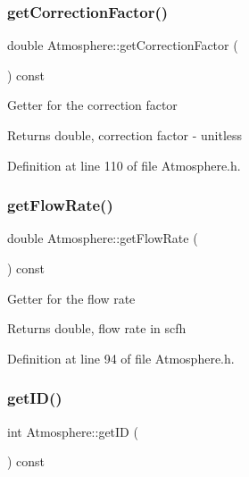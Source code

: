 \subsubsection{\texorpdfstring{get\+Correction\+Factor()}{getCorrectionFactor()}}
{\footnotesize\ttfamily double Atmosphere\+::get\+Correction\+Factor (\begin{DoxyParamCaption}{ }\end{DoxyParamCaption}) const\hspace{0.3cm}{\ttfamily [inline]}}

Getter for the correction factor \begin{DoxyReturn}{Returns}
double, correction factor -\/ unitless 
\end{DoxyReturn}


Definition at line 110 of file Atmosphere.\+h.

\mbox{\label{class_atmosphere_ad34708b12c8c9af4fce47669d68ebf4d}} 
\subsubsection{\texorpdfstring{get\+Flow\+Rate()}{getFlowRate()}}
{\footnotesize\ttfamily double Atmosphere\+::get\+Flow\+Rate (\begin{DoxyParamCaption}{ }\end{DoxyParamCaption}) const\hspace{0.3cm}{\ttfamily [inline]}}

Getter for the flow rate \begin{DoxyReturn}{Returns}
double, flow rate in scfh 
\end{DoxyReturn}


Definition at line 94 of file Atmosphere.\+h.

\mbox{\label{class_atmosphere_a73b921f4d29a4a409488cbdb56c53ff7}} 
\subsubsection{\texorpdfstring{get\+I\+D()}{getID()}}
{\footnotesize\ttfamily int Atmosphere\+::get\+ID (\begin{DoxyParamCaption}{ }\end{DoxyParamCaption}) const\hspace{0.3cm}{\ttfamily [inline]}}

